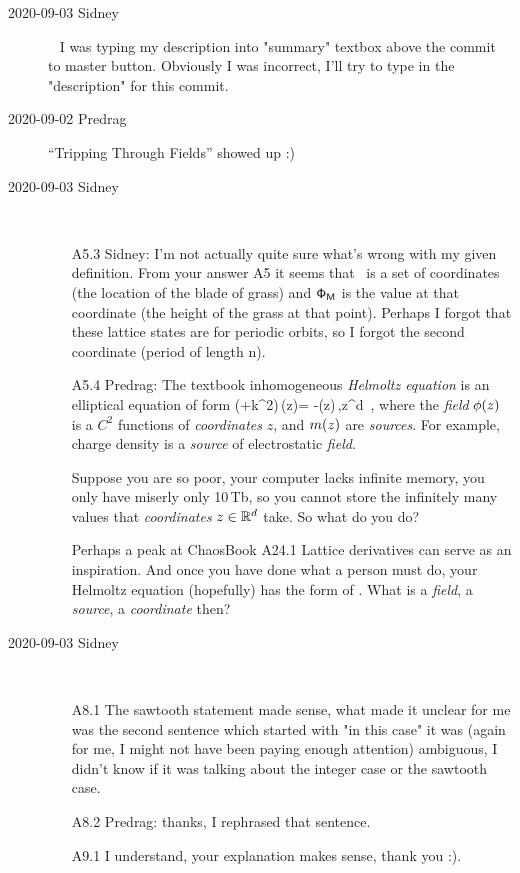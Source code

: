 \begin{description}
\item[2020-09-03 Sidney]~
I was typing my description into "summary" textbox above the commit to
master button. Obviously I was incorrect, I'll try to type in the
"description" for this commit.

\item[2020-09-02 Predrag]
``Tripping Through Fields'' showed up :)

\item[2020-09-03 Sidney]~~
\begin{itemize}
	\item[A5.3] Sidney:
I'm not actually quite sure what's wrong with my given definition. From
your answer A5 it seems that \Mm\ is a set of
coordinates (the location of the blade of grass) and $\mathsf{\Phi}_{\mathsf{M}}$ is
the value at that coordinate (the height of the grass at that point).
Perhaps I forgot that these lattice states are for periodic orbits, so I
forgot the second coordinate (period of length n).
	\item[A5.4] Predrag: %
The textbook inhomogeneous \emph{Helmoltz equation} is an elliptical
equation of form
\beq
   (\Box+k^2)\,\ssp(z)= -\m(z)\,,\qquad z\in \reals^d
\,,
\label{CatMapContinuesPC}
\eeq
where the \emph{field} $\phi(z)$ is a $C^2$ functions of
\emph{coordinates} $z$, and $m(z)$ are \emph{sources}. For example,
charge density is a \emph{source} of electrostatic \emph{field}.

Suppose you are so poor, your computer lacks infinite memory, you only
have miserly only 10\,Tb, so you cannot store the infinitely many values
that \emph{coordinates} $z\in \mathbb{R}^d$ take. So what do you do?

Perhaps a peak at ChaosBook
 {A24.1
Lattice derivatives} can serve as an inspiration. And once you have done
what a person must do, your Helmoltz equation (hopefully) has the form of
.
What is a \emph{field}, a \emph{source}, a \emph{coordinate} then?
\end{itemize}


\item[2020-09-03 Sidney]~~
\begin{itemize}
	\item[A8.1]
The sawtooth statement made sense, what made it unclear for me was the second sentence which started with "in this case" it was (again for me, I might not have been paying enough attention) ambiguous, I didn't know if it was talking about the integer case or the sawtooth case.  	
	\item[A8.2] Predrag: thanks, I rephrased that sentence.
	\item[A9.1]
I understand, your explanation makes sense, thank you :).
\end{itemize}


\end{description}
